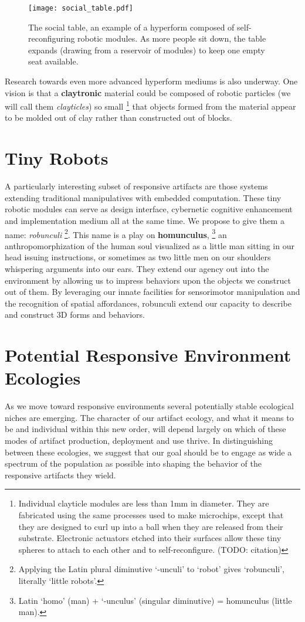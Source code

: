 \begin{figure}[tb]
  \centering
    \texttt{[image: social\_table.pdf]}
  \caption{The social table, an example of a hyperform composed of self-reconfiguring robotic modules. As more people sit down, the table expands (drawing from a reservoir of modules) to keep one empty seat available.}
  \label{fig:social_table}
\end{figure}

Research towards even more advanced hyperform mediums is also underway. One vision is that a \textbf{claytronic} \citep{goldstein_computer2005} material could be composed of robotic particles (we will call them \emph{clayticles}) so small%
\footnote{Individual clayticle modules are less than 1mm in diameter. 
They are fabricated using the same processes used to make microchips, except that they are designed to curl up into a ball when they are released from their substrate.
Electronic actuators etched into their surfaces allow these tiny spheres to attach to each other and to self{}-reconfigure. (TODO: citation)}
that objects formed from the material appear to be molded out of clay rather than constructed out of blocks.

\section{Tiny Robots}
%
A particularly interesting subset of responsive artifacts are those systems extending traditional manipulatives with embedded computation.
These tiny robotic modules can serve as design interface, cybernetic cognitive enhancement and implementation medium all at the same time. We propose to give them a name: \emph{robunculi}%
\footnote{Applying the Latin plural diminutive `-unculi' to `robot' gives `robunculi', literally `little robots'.}.
This name is a play on \textbf{homunculus},%
\footnote{Latin `homo' (man) + `-unculus' (singular diminutive) = homunculus (little man).}
an anthropomorphization of the human soul visualized as a little man sitting in our head issuing instructions, or sometimes as two little men on our shoulders whispering arguments into our ears. 
They extend our agency out into the environment by allowing us to impress behaviors upon the objects we construct out of them. 
By leveraging our innate facilities for sensorimotor manipulation and the recognition of spatial affordances, robunculi extend our capacity to describe and construct 3D forms and behaviors.

\section{Potential Responsive Environment Ecologies}
%
As we move toward responsive environments several potentially stable ecological niches are emerging. 
The character of our artifact ecology, and what it means to be and individual within this new order, will depend largely on which of these modes of artifact production, deployment and use thrive. 
In distinguishing between these ecologies, we suggest that our goal should be to engage as wide a spectrum of the population as possible into shaping the behavior of the responsive artifacts they wield. 

